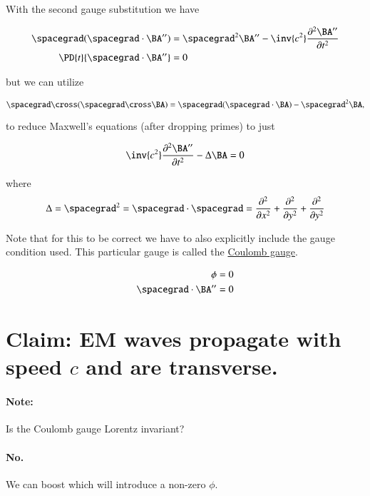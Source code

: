 With the second gauge substitution we have

\begin{align*}
\spacegrad (\spacegrad \cdot \BA'') &= \spacegrad^2 \BA''  - \inv{c^2} \frac{\partial^2 \BA''}{\partial t^2} \\
\PD{t}{\spacegrad \cdot \BA''}  &= 0
\end{align*}

but we can utilize

\begin{equation}\label{eqn:relativisticElectrodynamicsL14:310}
\spacegrad \cross (\spacegrad \cross \BA) = \spacegrad (\spacegrad \cdot \BA) - \spacegrad^2 \BA,
\end{equation}

to reduce Maxwell's equations (after dropping primes) to just

\begin{equation}\label{eqn:relativisticElectrodynamicsL14:330}
\inv{c^2} \frac{\partial^2 \BA''}{\partial t^2} - \Delta \BA = 0
\end{equation}

where 
\begin{equation}\label{eqn:relativisticElectrodynamicsL14:350}
\Delta = \spacegrad^2 = \spacegrad \cdot \spacegrad = 
\frac{\partial^2}{\partial x^2}
+\frac{\partial^2}{\partial y^2}
+\frac{\partial^2}{\partial y^2}
\end{equation}

Note that for this to be correct we have to also explicitly include the gauge condition used.  This particular gauge is called the \underline{Coulomb gauge}.

\begin{align}\label{eqn:relativisticElectrodynamicsL14:370}
\phi &= 0 \\
\spacegrad \cdot \BA'' &= 0 
\end{align}

\section{Claim: EM waves propagate with speed $c$ and are transverse.}

\paragraph{Note:} Is the Coulomb gauge Lorentz invariant?
\paragraph{No.} We can boost which will introduce a non-zero $\phi$.

